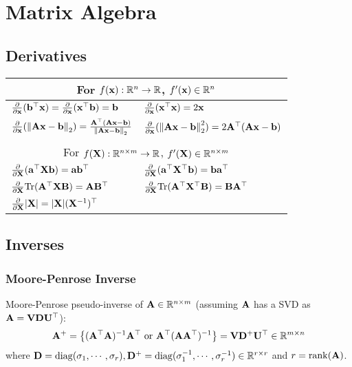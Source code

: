 \section{Matrix Algebra}
\subsection{Derivatives}
{\centering
{}
\begin{tabular}{p{7cm}p{7cm}}
\multicolumn{2}{c}{For $f(\bfx): \R^{n} \rightarrow \R$, $f'(\bfx) \in \R^n$ } \\  \midrule
$\diff{\bfx}(\bfb^\top \bfx) = \diff{\bfx}(\bfx^\top \bfb) = \bfb $ & $\diff{\bfx}(\bfx^\top \bfx) = 2 \bfx$ \\
$\diff{\bfx}(\norm{\bfA \bfx - \bfb}_2) = \frac{\bfA^\top (\bfA\bfx - \bfb)}{\norm{\bfA\bfx - \bfb}_2}$ & $\diff{\bfx}(\norm{\bfA \bfx - \bfb}_2^2) = {2\bfA^\top (\bfA\bfx - \bfb)}$ \\
\\
\multicolumn{2}{c}{For $f(\bfX): \R^{n \times m} \rightarrow \R$, $f'(\bfX) \in \R^{n \times m}$} \\
\midrule
$\diff{\bfX}(\bfa^\top \bfX \bfb) = \bfa \bfb^\top $ & $\diff{\bfX}(\bfa^\top \bfX^\top \bfb) = \bfb \bfa^\top $ \\
$\diff{\bfX}\mathrm{Tr}(\bfA^\top \bfX \bfB) = \bfA \bfB^\top $ & $\diff{\bfX}\mathrm{Tr}(\bfA^\top \bfX^\top \bfB) = \bfB \bfA^\top $ \\
$\diff{\bfX} |\bfX| = |\bfX| (\bfX^{-1})^\top$
\end{tabular}
}
\subsection{Inverses}
\subsubsection{Moore-Penrose Inverse}
Moore-Penrose pseudo-inverse of $\bfA \in \R^{n \times m}$ (assuming $\bfA$ has a SVD as $\bfA = \bfV \bfD \bfU^\top$):
\begin{equation}
	\bfA^+ = \left\{ (\bfA^\top \bfA)^{-1}\bfA^\top \text{ or } \bfA^\top (\bfA \bfA^\top)^{-1} \right\}= \bfV \bfD^+ \bfU^\top \in \R^{m \times n}
\end{equation}
where $ \bfD = \mathrm{diag}(\sigma_1, \cdots, \sigma_r), \bfD^+ = \mathrm{diag}(\sigma_1^{-1}, \cdots, \sigma_r^{-1}) \in \R^{r \times r}$ and $r = \mathrm{rank}(\bfA)$.

